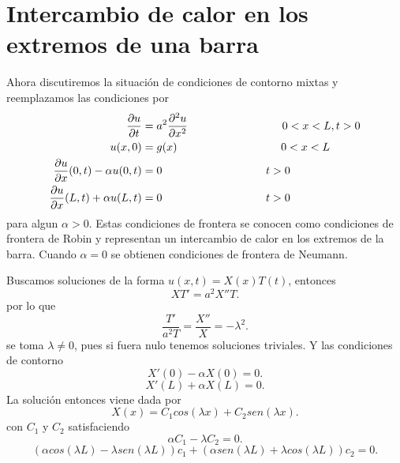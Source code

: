 \documentclass[11pt]{book}
\theoremstyle{plain}
\theoremstyle{definition}
\begin{document}
\section{Intercambio de calor en los extremos de una barra}
Ahora discutiremos la situación de condiciones de contorno mixtas y reemplazamos las condiciones por
\setcounter{equation}{0}
\begin{align}
    \frac{\partial u}{\partial t} &= a^{2} \frac{\partial^2 u}{\partial x^2} \hspace{30mm} 0<x<L, t > 0\\ 
    u(x,0)&= g(x) \hspace{33mm} 0<x<L\\
    \frac{\partial u}{\partial x}(0,t) - \alpha u(0,t) &= 0 \hspace{33mm} t>0\\
    \frac{\partial u}{\partial x}(L,t) + \alpha u(L,t) &= 0 \hspace{33mm} t>0
\end{align}
para algun $\alpha > 0$. Estas condiciones de frontera se conocen como condiciones de frontera de Robin y representan un intercambio de calor en los extremos de la barra. Cuando $\alpha = 0$ se obtienen condiciones de frontera de Neumann.

Buscamos soluciones de la forma $u(x,t) = X(x)T(t)$, entonces
\[
    XT' = a^{2}X''T
.\]
por lo que
\[
    \frac{T'}{a^{2}T} = \frac{X''}{X} = -\lambda^{2}
.\]
se toma $\lambda \neq 0$, pues si fuera nulo tenemos soluciones triviales. Y las condiciones de contorno
\[
    X'(0) - \alpha X(0) = 0
.\]
\[
    X'(L) + \alpha X(L) = 0
.\]
La solución entonces viene dada por
\[
    X(x) = C_{1}cos(\lambda x) + C_{2}sen(\lambda x)
.\]
con $C_{1}$ y $C_{2}$ satisfaciendo
\[
    \alpha C_{1} - \lambda C_{2} = 0
.\]
\[
    \left(\alpha cos (\lambda L) - \lambda sen(\lambda L)\right)c_{1} + \left(\alpha sen(\lambda L) + \lambda cos(\lambda L)\right)c_{2} = 0
.\]
\end{document}

